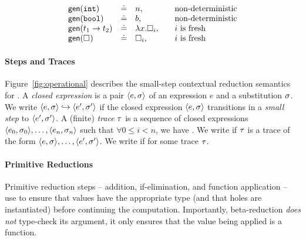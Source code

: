 $$
\begin{array}{lcll}
\mathsf{gen}(\mathtt{int})   & \doteq  & n, & \quad \text{non-deterministic} \\
\mathsf{gen}(\mathtt{bool})  & \doteq  & b, & \quad \text{non-deterministic} \\
\mathsf{gen}({t_1} \rightarrow t_2)   & \doteq & \lambda x. \square_{i}, & \quad \text{$i$ is fresh} \\
\mathsf{gen}(\square_{}) & \doteq & \square_{i}, & \quad \text{$i$ is fresh} \\
\end{array}
$$

\paragraph{Steps and Traces}
%
Figure~\ref{fig:operational} describes the small-step contextual
reduction semantics for \lang.
%
A \emph{closed expression} is a pair $\langle e, \sigma \rangle$ of an expression $e$
and a substitution $\sigma$.
%
We write $\langle e, \sigma \rangle \hookrightarrow \langle e', \sigma' \rangle$ if the closed expression $\langle e, \sigma \rangle$
transitions in a \emph{small step} to $\langle e', \sigma' \rangle$.
%
A (finite) \emph{trace} $\tau$ is a sequence of closed expressions
$\langle e_0, \sigma_0 \rangle, \ldots, \langle e_n, \sigma_n \rangle$ such that
$\forall 0 \leq i < n$, we have .
%
We write  if $\tau$ is a trace of the form
$\langle e, \sigma \rangle,\ldots,\langle e', \sigma' \rangle$.
%
We write  if 
for some trace $\tau$.

\paragraph{Primitive Reductions}
Primitive reduction steps -- addition, if-elimination, and
function application -- use \forcesym to ensure that values have the
appropriate type (and that holes are instantiated) before continuing the
computation. Importantly, beta-reduction \emph{does not} type-check its
argument, it only ensures that the value being applied is a function.


%
